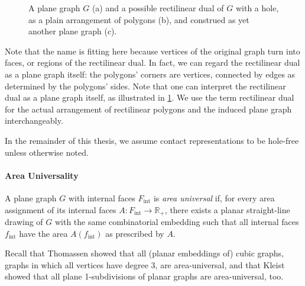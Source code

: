 \begin{figure}[H]
	\centering
	\quad
	\quad
	\caption{A plane graph $G$ (a) and a possible rectilinear dual of $G$ with a hole, as a plain arrangement of polygons (b), and construed as yet another plane graph (c).}
	\label{fig:preliminaries-rectilinear-dual}
\end{figure}

Note that the name  is fitting here because vertices of the original graph turn into faces, or regions of the rectilinear dual. In fact, we can regard the rectilinear dual as a plane graph itself: the polygons' corners are vertices, connected by edges as determined by the polygons' sides.
Note that one can interpret the rectilinear dual as a plane graph itself, as illustrated in \cref{fig:preliminaries-rectilinear-dual}. We use the term rectilinear dual for the actual arrangement of rectilinear polygons and the induced plane graph interchangeably.

In the remainder of this thesis, we assume contact representations to be hole-free unless otherwise noted.



\paragraph{Area Universality}

\begin{definition}
	A plane graph $G$ with internal faces $F_\text{int}$ is \emph{area universal} if, for every area assignment of its internal faces $A \colon F_\text{int} \to \mathbb{R}_+$, there exists a planar straight-line drawing of $G$ with the same combinatorial embedding such that all internal faces $f_\text{int}$ have the area $A(f_\text{int})$ as prescribed by $A$.
\end{definition}

Recall that Thomassen \cite{thomassen1992plane} showed that all (planar embeddings of) cubic graphs, \ie{} graphs in which all vertices have degree 3, are area-universal, and that Kleist \cite{kleist2019planar} showed that all plane 1-subdivisions of planar graphs are area-universal, too.
